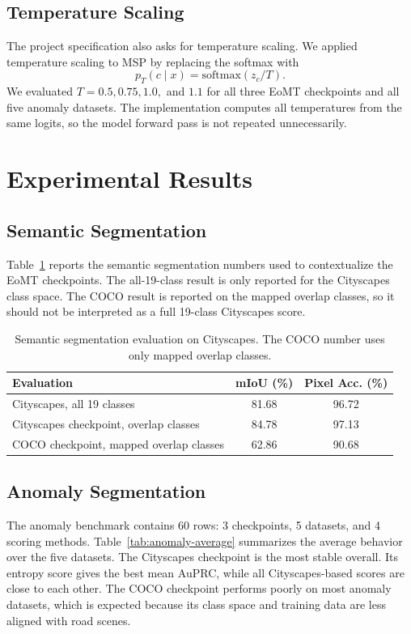 \subsection{Temperature Scaling}
The project specification also asks for temperature scaling. We applied temperature scaling to MSP by replacing the softmax with
\[
p_T(c \mid x) = \mathrm{softmax}(z_c/T).
\]
We evaluated $T=0.5, 0.75, 1.0,$ and $1.1$ for all three EoMT checkpoints and all five anomaly datasets. The implementation computes all temperatures from the same logits, so the model forward pass is not repeated unnecessarily.

\section{Experimental Results}
\subsection{Semantic Segmentation}
Table~\ref{tab:semantic} reports the semantic segmentation numbers used to contextualize the EoMT checkpoints. The all-19-class result is only reported for the Cityscapes class space. The COCO result is reported on the mapped overlap classes, so it should not be interpreted as a full 19-class Cityscapes score.

\begin{table}[t]
\centering
\small
\begin{tabular}{lcc}
\hline
Evaluation & mIoU (\%) & Pixel Acc. (\%) \\
\hline
Cityscapes, all 19 classes & 81.68 & 96.72 \\
Cityscapes checkpoint, overlap classes & 84.78 & 97.13 \\
COCO checkpoint, mapped overlap classes & 62.86 & 90.68 \\
\hline
\end{tabular}
\caption{Semantic segmentation evaluation on Cityscapes. The COCO number uses only mapped overlap classes.}
\label{tab:semantic}
\end{table}

\subsection{Anomaly Segmentation}
The anomaly benchmark contains 60 rows: 3 checkpoints, 5 datasets, and 4 scoring methods. Table~\ref{tab:anomaly-average} summarizes the average behavior over the five datasets. The Cityscapes checkpoint is the most stable overall. Its entropy score gives the best mean AuPRC, while all Cityscapes-based scores are close to each other. The COCO checkpoint performs poorly on most anomaly datasets, which is expected because its class space and training data are less aligned with road scenes.

